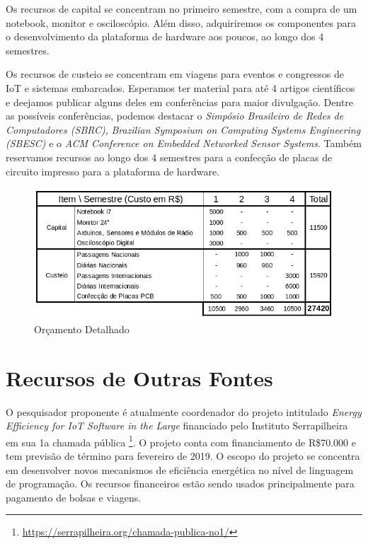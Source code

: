 \documentclass[titlepage,12pt]{article}
\begin{document}
Os recursos de capital se concentram no primeiro semestre, com a compra de um
notebook, monitor e osciloscópio.
Além disso, adquiriremos os componentes para o desenvolvimento da plataforma de
hardware aos poucos, ao longo dos 4 semestres.

Os recursos de custeio se concentram em viagens para eventos e congressos de
IoT e sistemas embarcados.
Esperamos ter material para até 4 artigos científicos e deejamos publicar
alguns deles em conferências para maior divulgação.
Dentre as possíveis conferências, podemos destacar o \emph{Simpósio Brasileiro
de Redes de Computadores (SBRC)}, \emph{Brazilian Symposium on Computing
Systems Engineering (SBESC)} e o \emph{ACM Conference on Embedded Networked
Sensor Systems}.
Também reservamos recursos ao longo dos 4 semestres para a confecção de placas
de circuito impresso para a plataforma de hardware.

\begin{figure}[t]
\includegraphics[width=\textwidth]{orcamento}
\caption{ Orçamento Detalhado \label{fig.orcamento} }
\end{figure}


\section{ Recursos de Outras Fontes }

O pesquisador proponente é atualmente coordenador do projeto intitulado
\emph{Energy Efficiency for IoT Software in the Large} financiado pelo
Instituto Serrapilheira em sua 1a chamada pública%
\footnote{\url{https://serrapilheira.org/chamada-publica-no1/}}.
%
O projeto conta com financiamento de R\$70.000 e tem previsão de término para
fevereiro de 2019.
%
O escopo do projeto se concentra em desenvolver novos mecanismos de eficiência
energética no nível de linguagem de programação.
%
Os recursos financeiros estão sendo usados principalmente para pagamento de
bolsas e viagens.
\end{document}
